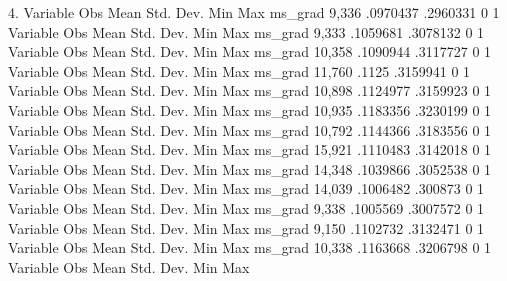   4. {\rbr}
{\smallskip}
    Variable {\VBAR}        Obs        Mean    Std. Dev.       Min        Max
     ms_grad {\VBAR}      9,336    .0970437    .2960331          0          1
{\smallskip}
    Variable {\VBAR}        Obs        Mean    Std. Dev.       Min        Max
     ms_grad {\VBAR}      9,333    .1059681    .3078132          0          1
{\smallskip}
    Variable {\VBAR}        Obs        Mean    Std. Dev.       Min        Max
     ms_grad {\VBAR}     10,358    .1090944    .3117727          0          1
{\smallskip}
    Variable {\VBAR}        Obs        Mean    Std. Dev.       Min        Max
     ms_grad {\VBAR}     11,760       .1125    .3159941          0          1
{\smallskip}
    Variable {\VBAR}        Obs        Mean    Std. Dev.       Min        Max
     ms_grad {\VBAR}     10,898    .1124977    .3159923          0          1
{\smallskip}
    Variable {\VBAR}        Obs        Mean    Std. Dev.       Min        Max
     ms_grad {\VBAR}     10,935    .1183356    .3230199          0          1
{\smallskip}
    Variable {\VBAR}        Obs        Mean    Std. Dev.       Min        Max
     ms_grad {\VBAR}     10,792    .1144366    .3183556          0          1
{\smallskip}
    Variable {\VBAR}        Obs        Mean    Std. Dev.       Min        Max
     ms_grad {\VBAR}     15,921    .1110483    .3142018          0          1
{\smallskip}
    Variable {\VBAR}        Obs        Mean    Std. Dev.       Min        Max
     ms_grad {\VBAR}     14,348    .1039866    .3052538          0          1
{\smallskip}
    Variable {\VBAR}        Obs        Mean    Std. Dev.       Min        Max
     ms_grad {\VBAR}     14,039    .1006482     .300873          0          1
{\smallskip}
    Variable {\VBAR}        Obs        Mean    Std. Dev.       Min        Max
     ms_grad {\VBAR}      9,338    .1005569    .3007572          0          1
{\smallskip}
    Variable {\VBAR}        Obs        Mean    Std. Dev.       Min        Max
     ms_grad {\VBAR}      9,150    .1102732    .3132471          0          1
{\smallskip}
    Variable {\VBAR}        Obs        Mean    Std. Dev.       Min        Max
     ms_grad {\VBAR}     10,338    .1163668    .3206798          0          1
{\smallskip}
    Variable {\VBAR}        Obs        Mean    Std. Dev.       Min        Max
